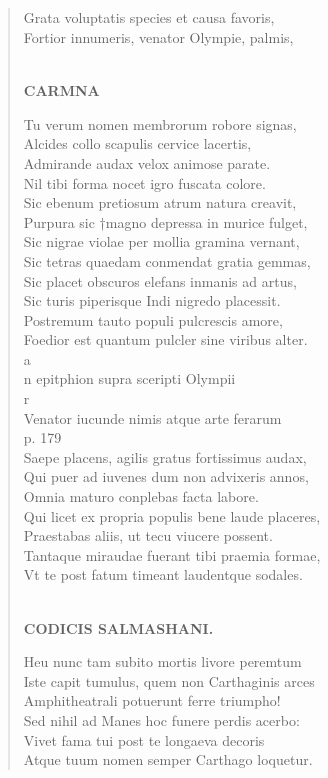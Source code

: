 \documentclass[11pt, a4paper]{report}
\begin{document}
            \subsection*{}
      \begin{verse}
      Grata voluptatis species et causa favoris, \\ Fortior innumeris, venator Olympie, palmis, \\ 
        ﻿\pagebreak 
    \begin{center} \textbf{CARMNA} \end{center} \marginpar{[278]} Tu verum nomen membrorum robore signas, \\ Alcides collo scapulis cervice lacertis, \\ Admirande audax velox animose parate. \\ Nil tibi forma nocet igro fuscata colore. \\ Sic ebenum pretiosum atrum natura creavit, \\ Purpura sic †magno depressa in murice fulget, \\ Sic nigrae violae per mollia gramina vernant, \\ Sic tetras quaedam conmendat gratia gemmas, \\ Sic placet obscuros elefans inmanis ad artus, \\ Sic turis piperisque Indi nigredo placessit. \\ Postremum tauto populi pulcrescis amore, \\ Foedior est quantum pulcler sine viribus alter. \\ a \\ n epitphion supra sceripti Olympii \\ r \\ Venator iucunde nimis atque arte ferarum \\ p. 179 \\ Saepe placens, agilis gratus fortissimus audax, \\ Qui puer ad iuvenes dum non advixeris annos, \\ Omnia maturo conplebas facta labore. \\ Qui licet ex propria populis bene laude placeres, \\ Praestabas aliis, ut tecu viucere possent. \\ Tantaque miraudae fuerant tibi praemia formae, \\ Vt te post fatum timeant laudentque sodales. \\ 
        ﻿\pagebreak 
    \begin{center} \textbf{CODICIS SALMASHANI.} \end{center} \marginpar{[279]} Heu nunc tam subito mortis livore peremtum \\ Iste capit tumulus, quem non Carthaginis arces \\ Amphitheatrali potuerunt ferre triumpho! \\ Sed nihil ad Manes hoc funere perdis acerbo: \\ Vivet fama tui post te longaeva decoris \\ Atque tuum nomen semper Carthago loquetur. \\ 
      \end{verse}
  
\end{document}
